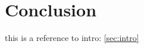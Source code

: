 \documentclass[../main.tex]{subfiles}
\begin{document}
\section{Conclusion} \label{sec:conclusion}

this is a reference to intro: \ref{sec:intro}
\end{document}
